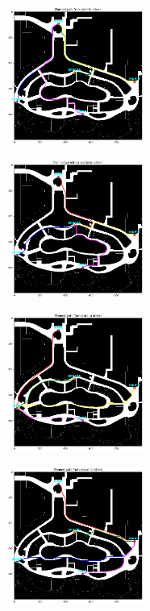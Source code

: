 \documentclass[hyperref]{article}
\theoremstyle{nonumberplain}
\begin{document}
\begin{figure}[H]
	\centering
	\begin{minipage}[t]{0.32\textwidth}
		\centering
		\includegraphics[width=4.5cm]{start_to_others.png}
		\label{fig2a}
	\end{minipage}
	\begin{minipage}[t]{0.32\textwidth}
		\centering
		\includegraphics[width=4.5cm]{snacks_to_others.png}
		\label{fig2b}
	\end{minipage}
	\begin{minipage}[t]{0.32\textwidth}
		\centering
		\includegraphics[width=4.5cm]{store_to_others.png}
		\label{fig2c}
	\end{minipage}
	\begin{minipage}[t]{0.45\textwidth}
		\centering
		\includegraphics[width=4.5cm]{movie_to_others.png}

\end{minipage}
\end{figure}
\end{document}
